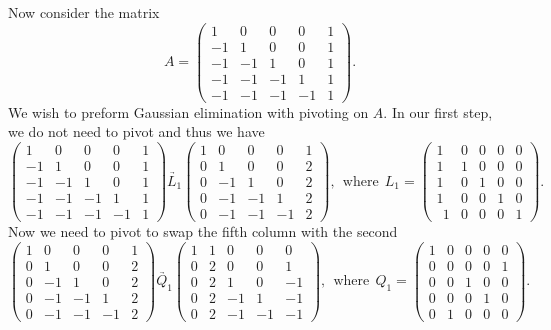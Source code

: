 Now consider the matrix
\[ 
    A = \begin{pmatrix}1&0&0&0&1\\ -1&1&0&0&1\\ -1&-1&1&0&1\\-1&-1&-1&1&1\\ -1&-1&-1&-1&1\end{pmatrix}.
\]
We wish to preform Gaussian elimination with pivoting on $A$. In our first step, we do not need to pivot and thus we have
\[ 
    \begin{pmatrix}1&0&0&0&1\\ -1&1&0&0&1\\ -1&-1&1&0&1\\-1&-1&-1&1&1\\ -1&-1&-1&-1&1\end{pmatrix} \underrightarrow{L_1} \begin{pmatrix}1&0&0&0&1\\ 0&1&0&0&2\\ 0&-1&1&0&2\\ 0&-1&-1&1&2\\ 0&-1&-1&-1&2\end{pmatrix}, ~~ \text{where} ~~ L_1 = \begin{pmatrix}1&0&0&0&0\\ 1&1&0&0&0\\ 1&0&1&0&0\\ 1&0&0&1&0\\ \:\:1&0&0&0&1\end{pmatrix}.
\] 
Now we need to pivot to swap the fifth column with the second
\[
    \begin{pmatrix}1&0&0&0&1\\ 0&1&0&0&2\\ 0&-1&1&0&2\\ 0&-1&-1&1&2\\ 0&-1&-1&-1&2\end{pmatrix} \underrightarrow{Q_1} \begin{pmatrix}1&1&0&0&0\\ 0&2&0&0&1\\ 0&2&1&0&-1\\ 0&2&-1&1&-1\\ 0&2&-1&-1&-1\end{pmatrix}, ~~ \text{where}~~ Q_1 = \begin{pmatrix}1&0&0&0&0\\ 0&0&0&0&1\\ 0&0&1&0&0\\ 0&0&0&1&0\\ 0&1&0&0&0\end{pmatrix}.
\]
